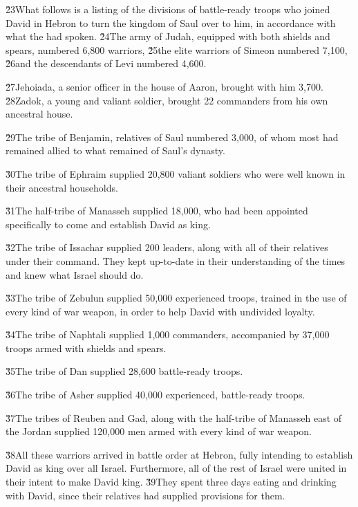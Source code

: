 \v{23}What follows is a listing of the divisions of battle-ready troops who joined David in Hebron to turn the kingdom of Saul over to him, in accordance with what the  had spoken. \v{24}The army of Judah, equipped with both shields and spears, numbered 6,800 warriors, \v{25}the elite warriors of Simeon numbered 7,100, \v{26}and the descendants of Levi numbered 4,600.

\v{27}Jehoiada, a senior officer in the house of Aaron, brought with him 3,700. \v{28}Zadok, a young and valiant soldier, brought 22 commanders from his own ancestral house.

\v{29}The tribe of Benjamin, relatives of Saul numbered 3,000, of whom most had remained allied to what remained of Saul's dynasty.

\v{30}The tribe of Ephraim supplied 20,800 valiant soldiers who were well known in their ancestral households.

\v{31}The half-tribe of Manasseh supplied 18,000, who had been appointed specifically to come and establish David as king.

\v{32}The tribe of Issachar supplied 200 leaders, along with all of their relatives under their command. They kept up-to-date in their understanding of the times and knew what Israel should do.

\v{33}The tribe of Zebulun supplied 50,000 experienced troops, trained in the use of every kind of war weapon, in order to help David with undivided loyalty.

\v{34}The tribe of Naphtali supplied 1,000 commanders, accompanied by 37,000 troops armed with shields and spears.

\v{35}The tribe of Dan supplied 28,600 battle-ready troops.

\v{36}The tribe of Asher supplied 40,000 experienced, battle-ready troops.

\v{37}The tribes of Reuben and Gad, along with the half-tribe of Manasseh east of the Jordan supplied 120,000 men armed with every kind of war weapon.

\v{38}All these warriors arrived in battle order at Hebron, fully intending to establish David as king over all Israel. Furthermore, all of the rest of Israel were united in their intent to make David king. \v{39}They spent three days eating and drinking with David, since their relatives had supplied provisions for them.

